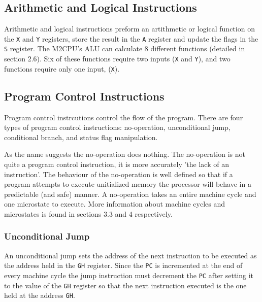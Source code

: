\documentclass[a4paper,12pt]{article}
\newcommand{\mt}{M2CPU}
\newcommand{\Ar}{\texttt{A}}
\newcommand{\Gr}{\texttt{G}}
\newcommand{\Hr}{\texttt{H}}
\newcommand{\Xr}{\texttt{X}}
\newcommand{\Yr}{\texttt{Y}}
\newcommand{\Sr}{\texttt{S}}
\newcommand{\PC}{\texttt{PC}}
\begin{document}
\subsection{Arithmetic and Logical Instructions}
Arithmetic and logical instructions preform an artithmetic or logical function
on the \Xr{} and \Yr{} registers, store the result in the \Ar{} register and 
update the flags in the \Sr{} register. The \mt{}'s ALU can calculate 8 
different functions (detailed in section 2.6). Six of these functions require
two inputs (\Xr{} and \Yr{}), and two functions require only one input, (\Xr{}).
\par

\subsection{Program Control Instructions}
Program control instrcutions control the flow of the program. There are four
types of program control instructions: no-operation, unconditional jump,
conditional branch, and status flag manipulation.
\par

As the name suggests the no-operation does nothing. The no-operation is not 
quite a program control instruction, it is more accurately 'the lack of an 
instruction'. The behaviour of the no-operation is well defined so that if a 
program attempts to execute unitialized memory the processor will behave in a 
predictable (and safe) manner. A no-operation takes an entire machine cycle and
one microstate to execute. More information about machine cycles and 
microstates is found in sections 3.3 and 4 respectively.
\par

\subsubsection{Unconditional Jump}
An unconditional jump sets the address of the next instruction to be executed
as the address held in the \Gr{}\Hr{} register. Since the \PC{} is incremented
at the end of every machine cycle  the jump instruction must decrement the \PC{}
after setting it to the value of the \Gr{}\Hr{} register so that the next 
instruction executed is the one held at the address \Gr{}\Hr{}.
\par
\end{document}

